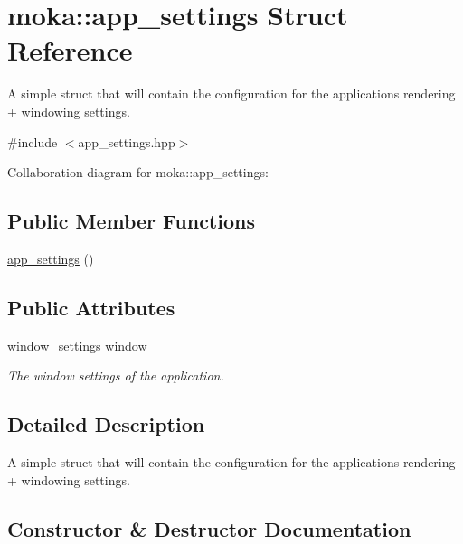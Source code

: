 \hypertarget{structmoka_1_1app__settings}{}\section{moka\+::app\+\_\+settings Struct Reference}
\label{structmoka_1_1app__settings}


A simple struct that will contain the configuration for the application\textquotesingle{}s rendering + windowing settings.  




{\ttfamily \#include $<$app\+\_\+settings.\+hpp$>$}



Collaboration diagram for moka\+::app\+\_\+settings\+:
\subsection*{Public Member Functions}
\begin{DoxyCompactItemize}
\item 
\mbox{\hyperlink{structmoka_1_1app__settings_a9218c2449e87da4e184651885b8519ca}{app\+\_\+settings}} ()
\end{DoxyCompactItemize}
\subsection*{Public Attributes}
\begin{DoxyCompactItemize}
\item 
\mbox{\hyperlink{structmoka_1_1window__settings}{window\+\_\+settings}} \mbox{\hyperlink{structmoka_1_1app__settings_a0eb275d37ec4c67aea36de8a5d8d8823}{window}}
\begin{DoxyCompactList}\small\item\em The window settings of the application. \end{DoxyCompactList}\end{DoxyCompactItemize}


\subsection{Detailed Description}
A simple struct that will contain the configuration for the application\textquotesingle{}s rendering + windowing settings. 

\subsection{Constructor \& Destructor Documentation}
\mbox{\label{structmoka_1_1app__settings_a9218c2449e87da4e184651885b8519ca}} 
